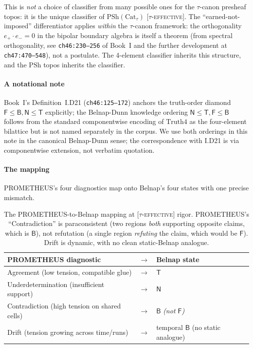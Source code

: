 \documentclass{pantarhei-researchnote}
\newcommand{\TEFF}{\textsc{[$\tau$-effective]}}
\newcommand{\Truth}{\ensuremath{\mathrm{Truth4}}}
\newcommand{\Cattau}{\ensuremath{\mathrm{Cat}_{\tau}}}
\newcommand{\PSh}{\ensuremath{\mathrm{PSh}}}
\begin{document}
This is \emph{not} a choice of classifier from many possible ones
for the $\tau$-canon presheaf topos: it is the unique classifier of
$\PSh(\Cattau)$ \TEFF. The ``earned-not-imposed'' differentiator
applies \emph{within} the $\tau$-canon framework: the orthogonality
$e_{+} \cdot e_{-} = 0$ in the bipolar boundary algebra is itself
a theorem (from spectral orthogonality, see \texttt{ch46:230--256}
of Book~I and the further development at \texttt{ch47:470--548}),
not a postulate. The 4-element classifier inherits this structure,
and the $\PSh$ topos inherits the classifier.

\paragraph{A notational note}
Book~I's Definition~I.D21 (\texttt{ch46:125--172}) anchors the
truth-order diamond $\mathsf{F} \le \mathsf{B}, \mathsf{N} \le
\mathsf{T}$ explicitly; the Belnap-Dunn knowledge ordering
$\mathsf{N} \le \mathsf{T}, \mathsf{F} \le \mathsf{B}$ follows from
the standard componentwise encoding of $\Truth$ as the four-element
bilattice but is not named separately in the corpus. We use both
orderings in this note in the canonical Belnap-Dunn sense; the
correspondence with I.D21 is via componentwise extension, not
verbatim quotation.

\paragraph{The mapping}
PROMETHEUS's four diagnostics map onto Belnap's four states with
one precise mismatch.

\begin{table}[t]
\centering
\begin{tabular}{lcl}
\toprule
PROMETHEUS diagnostic & $\to$ & Belnap state \\
\midrule
Agreement (low tension, compatible glue) & $\to$ & $\mathsf{T}$ \\
Underdetermination (insufficient support) & $\to$ & $\mathsf{N}$ \\
Contradiction (high tension on shared cells) & $\to$ & $\mathsf{B}$ \emph{(not $\mathsf{F}$)} \\
Drift (tension growing across time/runs) & $\to$ & temporal $\mathsf{B}$ (no static analogue) \\
\bottomrule
\end{tabular}
\caption{The PROMETHEUS-to-Belnap mapping at \TEFF{} rigor.
PROMETHEUS's ``Contradiction'' is paraconsistent (two regions
\emph{both} supporting opposite claims, which is $\mathsf{B}$), not
refutation (a single region \emph{refuting} the claim, which would
be $\mathsf{F}$). Drift is dynamic, with no clean static-Belnap
analogue.}
\label{tab:prometheus-belnap}
\end{table}
\end{document}
